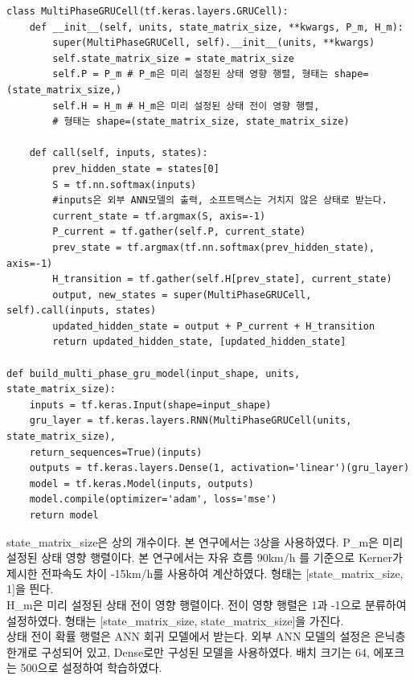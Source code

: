 \documentclass[11pt]{report}
\begin{document}
\begin{scriptsize}  %
\begin{verbatim}
class MultiPhaseGRUCell(tf.keras.layers.GRUCell):
    def __init__(self, units, state_matrix_size, **kwargs, P_m, H_m):
        super(MultiPhaseGRUCell, self).__init__(units, **kwargs)
        self.state_matrix_size = state_matrix_size
        self.P = P_m # P_m은 미리 설정된 상태 영향 행렬, 형태는 shape=(state_matrix_size,)
        self.H = H_m # H_m은 미리 설정된 상태 전이 영향 행렬, 
		# 형태는 shape=(state_matrix_size, state_matrix_size)

    def call(self, inputs, states):
        prev_hidden_state = states[0]
        S = tf.nn.softmax(inputs) 
		#inputs은 외부 ANN모델의 출력, 소프트맥스는 거치지 않은 상태로 받는다. 
        current_state = tf.argmax(S, axis=-1)
        P_current = tf.gather(self.P, current_state)
        prev_state = tf.argmax(tf.nn.softmax(prev_hidden_state), axis=-1)
        H_transition = tf.gather(self.H[prev_state], current_state)
        output, new_states = super(MultiPhaseGRUCell, self).call(inputs, states)
        updated_hidden_state = output + P_current + H_transition
        return updated_hidden_state, [updated_hidden_state]

def build_multi_phase_gru_model(input_shape, units, state_matrix_size):
    inputs = tf.keras.Input(shape=input_shape)
    gru_layer = tf.keras.layers.RNN(MultiPhaseGRUCell(units, state_matrix_size), 
	return_sequences=True)(inputs)
    outputs = tf.keras.layers.Dense(1, activation='linear')(gru_layer)
    model = tf.keras.Model(inputs, outputs)
    model.compile(optimizer='adam', loss='mse')
    return model
\end{verbatim}
\end{scriptsize}

\indent state\_matrix\_size은 상의 개수이다. 본 연구에서는 3상을 사용하였다. 
P\_m은 미리 설정된 상태 영향 행렬이다. 본 연구에서는 자유 흐름 90km\slash h 를 기준으로 
Kerner가 제시한 전파속도 차이 -15km\slash h를 사용하여 계산하였다.
형태는 [state\_matrix\_size, 1]을 띈다. \\
\indent H\_m은 미리 설정된 상태 전이 영향 행렬이다. 
전이 영향 행렬은 1과 -1으로 분류하여 설정하였다. 
형태는 [state\_matrix\_size, state\_matrix\_size]을 가진다. \\
\indent 상태 전이 확률 행렬은 ANN 회귀 모델에서 받는다. 
외부 ANN 모델의 설정은 은닉층 한개로 구성되어 있고, Dense로만 구성된 모델을 사용하였다. 
배치 크기는 64, 에포크는 500으로 설정하여 학습하였다. 
\end{document}
